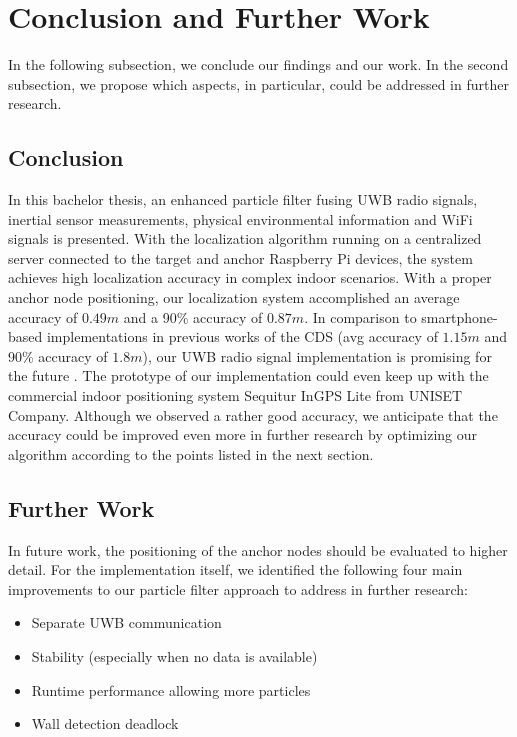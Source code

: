 
\chapter{Conclusion and Further Work} %

\label{Chapter7} %
In the following subsection, we conclude our findings and our work. In the second subsection, we propose which aspects, in particular, could be addressed in further research. 


\section{Conclusion}
In this bachelor thesis, an enhanced particle filter fusing UWB radio signals, inertial sensor measurements, physical environmental information and WiFi signals is presented. With the localization algorithm running on a centralized server connected to the target and anchor Raspberry Pi devices, the system achieves high localization accuracy in complex indoor scenarios. With a proper anchor node positioning, our localization system accomplished an average accuracy of $0.49m$ and a 90\% accuracy of $0.87m$. In comparison to smartphone-based implementations in previous works of the CDS (avg accuracy of $1.15m$ and 90\% accuracy of $1.8m$), our UWB radio signal implementation is promising for the future \cite{Carrera}. The prototype of our implementation could even keep up with the commercial indoor positioning system Sequitur InGPS Lite from UNISET Company. Although we observed a rather good accuracy, we anticipate that the accuracy could be improved even more in further research by optimizing our algorithm according to the points listed in the next section.



\section{Further Work}
In future work, the positioning of the anchor nodes should be evaluated to higher detail. For the implementation itself, we identified the following four main improvements to our particle filter approach to address in further research:
\begin{itemize}
\item Separate UWB communication
\item Stability (especially when no data is available)
\item Runtime performance allowing more particles
\item Wall detection deadlock
\end{itemize}


